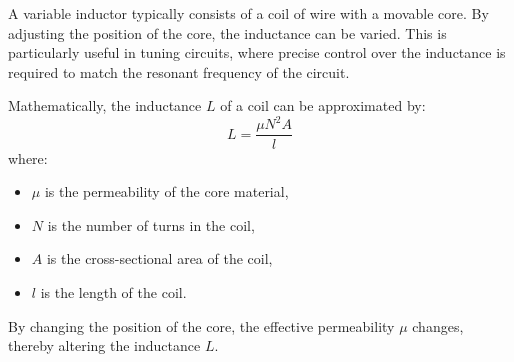 A variable inductor typically consists of a coil of wire with a movable core. By adjusting the position of the core, the inductance can be varied. This is particularly useful in tuning circuits, where precise control over the inductance is required to match the resonant frequency of the circuit.

Mathematically, the inductance \( L \) of a coil can be approximated by:
\[ L = \frac{\mu N^2 A}{l} \]
where:
\begin{itemize}
    \item \( \mu \) is the permeability of the core material,
    \item \( N \) is the number of turns in the coil,
    \item \( A \) is the cross-sectional area of the coil,
    \item \( l \) is the length of the coil.
\end{itemize}

By changing the position of the core, the effective permeability \( \mu \) changes, thereby altering the inductance \( L \).

